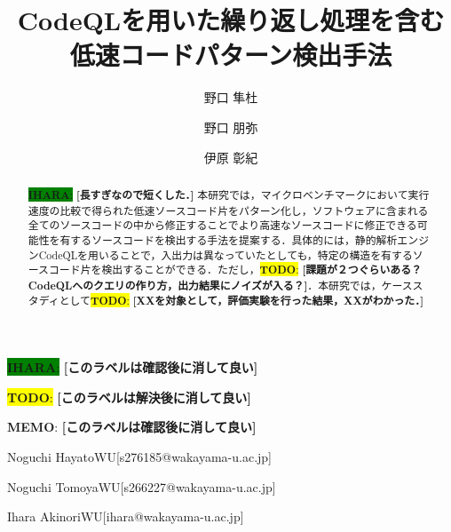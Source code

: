 \documentclass[submit,techrep,noauthor]{ipsj}
\newcommand{\todo}[1]{\colorbox{yellow}{{\bf TODO}:}{\color{red} {\textbf{[#1]}}}}
\newcommand{\memo}[1]{\colorbox{magenta!30}{{\bf MEMO}:}{\color{red!50} {\textbf{[#1]}}}}
\newcommand{\ihara}[1]{\colorbox{green}{{\bf IHARA}:}{\color{blue} {\textbf{[#1]}}}}
\begin{document}
\title{CodeQLを用いた繰り返し処理を含む
\\
低速コードパターン検出手法
}

\noindent\ihara{このラベルは確認後に消して良い}

\noindent\todo{このラベルは解決後に消して良い}

\noindent\memo{このラベルは確認後に消して良い}


\author{野口 隼杜}{Noguchi Hayato}{WU}[s276185@wakayama-u.ac.jp]
\author{野口 朋弥}{Noguchi Tomoya}{WU}[s266227@wakayama-u.ac.jp]
\author{伊原 彰紀}{Ihara Akinori}{WU}[ihara@wakayama-u.ac.jp]

\begin{abstract}
\ihara{長すぎなので短くした．}
本研究では，マイクロベンチマークにおいて実行速度の比較で得られた低速ソースコード片をパターン化し，ソフトウェアに含まれる全てのソースコードの中から修正することでより高速なソースコードに修正できる可能性を有するソースコードを検出する手法を提案する．具体的には，静的解析エンジンCodeQLを用いることで，入出力は異なっていたとしても，特定の構造を有するソースコード片を検出することができる．ただし，\todo{課題が２つぐらいある？CodeQLへのクエリの作り方，出力結果にノイズが入る？}．本研究では，ケーススタディとして\todo{XXを対象として，評価実験を行った結果，XXがわかった．}
\end{abstract}
\end{document}
